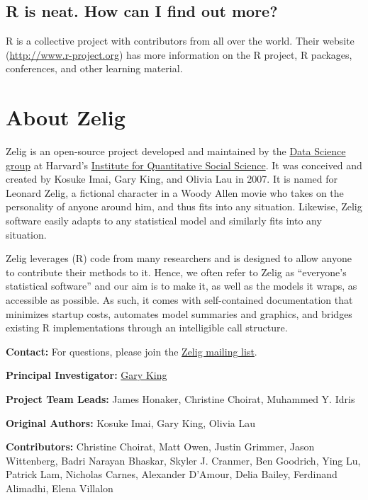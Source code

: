 \documentclass[letterpaper,10pt,english]{sphinxmanual}
\begin{document}
\section{R is neat. How can I find out more?}
\label{faq:r-is-neat-how-can-i-find-out-more}
R is a collective project with contributors from all over the world. Their website (\href{http://www.r-project.org}{http://www.r-project.org}) has more information on the R project, R packages, conferences, and other learning material.


\chapter{About Zelig}
\label{about:about}\label{about::doc}\label{about:about-zelig}
Zelig is an open-source project developed and maintained by the \href{http://datascience.iq.harvard.edu/}{Data Science group} at Harvard's \href{http://iq.harvard.edu}{Institute for Quantitative Social Science}. It was conceived and created by Kosuke Imai, Gary King, and Olivia Lau in 2007. It is named for Leonard Zelig, a fictional character in a Woody Allen movie who takes on the personality of anyone around him, and thus fits into any situation. Likewise, Zelig software easily adapts to any statistical model and similarly fits into any situation.

Zelig leverages (R) code from many researchers and is designed to allow anyone to contribute their methods to it. Hence, we often refer to Zelig as ``everyone's statistical software'' and our aim is to make it, as well as the models it wraps, as accessible as possible. As such, it comes with self-contained documentation that minimizes startup costs, automates model summaries and graphics, and bridges existing R implementations through an intelligible call structure.

\textbf{Contact:} For questions, please join the \href{https://groups.google.com/forum/\#!forum/zelig-statistical-software}{Zelig mailing list}.

\textbf{Principal Investigator:} \href{http://gking.harvard.edu/}{Gary King}

\textbf{Project Team Leads:} James Honaker, Christine Choirat, Muhammed Y. Idris

\textbf{Original Authors:} Kosuke Imai, Gary King, Olivia Lau

\textbf{Contributors:}  Christine Choirat, Matt Owen, Justin Grimmer, Jason Wittenberg, Badri Narayan Bhaskar, Skyler J. Cranmer, Ben Goodrich, Ying Lu, Patrick Lam, Nicholas Carnes, Alexander D'Amour, Delia Bailey, Ferdinand Alimadhi, Elena Villalon
\end{document}
